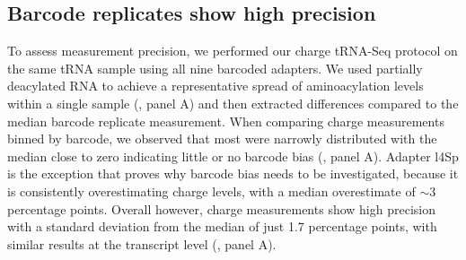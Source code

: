 \documentclass[9pt,lineno]{elife}
\begin{document}
\begin{figure}[ht!]
\label{figsupp:f3S2}
\end{figure}





\subsection{Barcode replicates show high precision}
To assess measurement precision, we performed our charge tRNA-Seq protocol on the same tRNA sample using all nine barcoded adapters.
We used partially deacylated RNA to achieve a representative spread of aminoacylation levels within a single sample (, panel A) and then extracted differences compared to the median barcode replicate measurement.
When comparing charge measurements binned by barcode, we observed that most were narrowly distributed with the median close to zero indicating little or no barcode bias (, panel A).
Adapter l4Sp is the exception that proves why barcode bias needs to be investigated, because it is consistently overestimating charge levels, with a median overestimate of $\sim$3 percentage points.
Overall however, charge measurements show high precision with a standard deviation from the median of just 1.7 percentage points, with similar results at the transcript level (, panel A).
\end{document}
